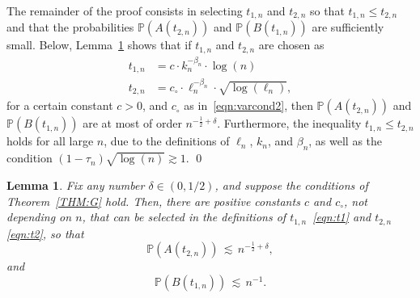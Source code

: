 \documentclass[aos,preprint]{imsart}
\numberwithin{equation}{section}
\theoremstyle{plain}
\newtheorem{lemma}{Lemma}[section]
\renewcommand{\P}{\mathbb{P}}
\newcommand{\1}{{\bf{1}}}
\newcommand{\0}{\mathbf{0}}
\begin{document}
The remainder of the proof consists in selecting $t_{1,n}$ and $t_{2,n}$ so that $t_{1,n}\leq t_{2,n}$ and that the probabilities $\P(A(t_{2,n}))$ and $\P(B(t_{1,n}))$ are sufficiently small. Below, Lemma~\ref{lem:bounds} shows that if $t_{1,n}$ and $t_{2,n}$ are chosen as 
\begin{align}
t_{1,n}&=c\cdot k_n^{-\beta_n}\cdot \log(n)  \label{eqn:t1}\\[0.3cm]
%
t_{2,n}&=c_{\circ}\cdot \ell_n^{-\beta_n}\cdot\sqrt{\log(\ell_n)},\label{eqn:t2}
\end{align}
for a certain constant $c>0$, and $c_{\circ}$ as in~\eqref{eqn:varcond2}, then  $\P(A(t_{2,n}))$ and $\P(B(t_{1,n}))$ are at most of order $n^{-\frac 12+\delta}$. Furthermore, the inequality $t_{1,n}\leq t_{2,n}$ holds for all large $n$, due to the definitions of $\ell_n$, $k_n$, and $\beta_n$, as well as the condition $(1-\tau_n)\sqrt{\log(n)}\gtrsim 1$.
%
\qed
%
%
%
\begin{lemma}\label{lem:bounds}
Fix any number $\delta\in(0,1/2)$, and suppose the conditions of Theorem~\ref{THM:G} hold. Then, there are positive constants $c$ and $c_{\circ}$, not depending on $n$, that can be selected in the definitions of $t_{1,n}$~\eqref{eqn:t1} and $t_{2,n}$\,\eqref{eqn:t2}, so that
\begin{equation}\label{aboundlem}
\P(A(t_{2,n})) \, \lesssim \, n^{-\frac 12+\delta},\tag{a}
\end{equation}
and
\begin{equation}\label{bboundlem}
\P(B(t_{1,n})) \, \lesssim \,  n^{-1}.\tag{b}
\end{equation}
%
%
\end{lemma}
\end{document}
